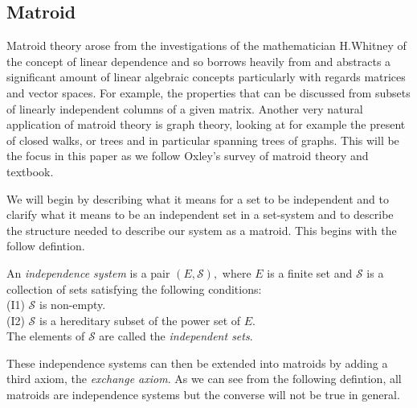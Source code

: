 \documentclass[../main.tex]{subfiles}
\begin{document}
\subsection{Matroid}
Matroid theory arose from the investigations of the mathematician H.Whitney \cite{whitney} of the concept of linear dependence and so borrows heavily from and abstracts a significant amount of linear algebraic concepts particularly with regards  matrices and vector spaces. For example, the properties that can be discussed from subsets of linearly independent columns of a given  matrix. Another very natural application of matroid theory is graph theory, looking at for example the present of closed walks, or trees and in particular spanning trees of graphs. This will be the focus in this paper as we follow Oxley's survey of matroid theory\cite{ox_paper} and textbook.\cite{ox_book}\\ 

\vspace{1mm}

\noindent We will begin by describing what it means for a set to be independent and to clarify what it means to be an independent set in a set-system and to describe the structure needed to describe our system as a matroid. This begins with the follow defintion.

\begin{defn}
An \textit{independence system} is a pair $(E,\mathcal{S}),$ where $E$ is a finite set and $\mathcal{S}$ is a collection of sets satisfying the following conditions:\\
\noindent (I1) $\mathcal{S}$ is non-empty.\\
\noindent (I2) $\mathcal{S}$ is a  hereditary subset of the power set of $E$.\\
\noindent The elements of $\mathcal{S}$ are called the \textit{independent sets}.
\end{defn}

\noindent These independence systems can then be extended into matroids by adding a third axiom, the \textit{exchange axiom}. As we can see from the following defintion, all matroids are independence systems but the converse will not be true in general.
\end{document}
